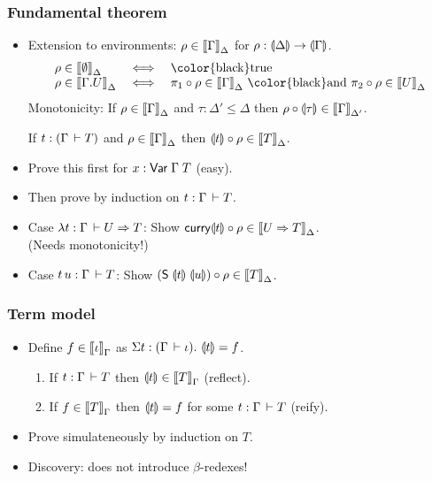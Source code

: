 \documentclass[t,fleqn,usenames,dvipsnames]{beamer}
\renewcommand{\Var}[2]{\tVar\;#1\;#2}
\newcommand{\mybox}[1]{\mbox{\color{black}#1}}
\renewcommand{\mand}{\ \mybox{and}\ }
\renewcommand{\mtrue}{\mybox{true}}
\begin{document}
\begin{frame}%
  \frametitle{Fundamental theorem}
  \vspace{-3ex}
  \begin{itemize}
  \item Extension to environments: $\rho \in \mathopen{{[\kern-0.14em[}} \Gamma \mathclose{{]\kern-0.14em]}}_{\Delta}$ for
    $\rho : \llparenthesis\Delta\rrparenthesis \to \llparenthesis\Gamma\rrparenthesis$.
\[
\begin{array}{lll}
  \rho \in \Den \cempty \Delta & \iff & \mtrue \\
  \rho \in \Den {\Gamma.U} \Delta & \iff &
    \pi_1 \comp \rho \in \Den \Gamma \Delta \mand
    \pi_2 \comp \rho \in \Den U \Delta
\end{array}
\]
  Monotonicity: If $\rho \in \mathopen{{[\kern-0.14em[}} \Gamma \mathclose{{]\kern-0.14em]}}_{\Delta}$ and $\tau : \Delta'
  \leq \Delta$ then $\rho \circ \llparenthesis\tau\rrparenthesis \in \mathopen{{[\kern-0.14em[}} \Gamma \mathclose{{]\kern-0.14em]}}_{\Delta'}$.
\begin{theorem}
  If $t : (\Gamma \,\vdash T)$ and $\rho \in \mathopen{{[\kern-0.14em[}} \Gamma \mathclose{{]\kern-0.14em]}}_{\Delta}$ then
  $\llparenthesis t\rrparenthesis \circ \rho \in \mathopen{{[\kern-0.14em[}} T \mathclose{{]\kern-0.14em]}}_{\Delta}$.
\end{theorem}
  \item Prove this first for $x : \Var \Gamma T$ (easy).
  \item Then prove by induction on $t : \Gamma \,\vdash T$.
  \item Case $\lambda t : \Gamma \,\vdash U \Rightarrow T$:
    Show $\mathsf{curry} \llparenthesis t\rrparenthesis \circ \rho \in \mathopen{{[\kern-0.14em[}} U \Rightarrow T \mathclose{{]\kern-0.14em]}}_{\Delta}$. \\
    (Needs monotonicity!)
  \item Case $t\,u : \Gamma \,\vdash T$:
    Show $(\mathsf{S}\;\llparenthesis t\rrparenthesis \; \llparenthesis u\rrparenthesis) \circ \rho \in \mathopen{{[\kern-0.14em[}} T \mathclose{{]\kern-0.14em]}}_{\Delta}$.
  \end{itemize}
\end{frame}


\begin{frame}%
  \frametitle{Term model}
  \vspace{-3ex}
  \begin{itemize}
  \item Define $f \in \mathopen{{[\kern-0.14em[}} \iota \mathclose{{]\kern-0.14em]}}_{\Gamma}$ as $\Sigma t : (\Gamma \,\vdash
    \iota).\ \llparenthesis t\rrparenthesis = f$.
    \begin{theorem}
      \begin{enumerate}
      \item If $t : \Gamma \,\vdash T$ then $\llparenthesis t\rrparenthesis \in \mathopen{{[\kern-0.14em[}} T \mathclose{{]\kern-0.14em]}}_{\Gamma}$ (reflect).
      \item If $f \in \mathopen{{[\kern-0.14em[}} T \mathclose{{]\kern-0.14em]}}_{\Gamma}$ then $\llparenthesis t\rrparenthesis = f$ for some $t :
        \Gamma \,\vdash T$ (reify).
      \end{enumerate}
    \end{theorem}
  \item Prove simulateneously by induction on $T$.
  \item Discovery: does not introduce $\beta$-redexes!
  \end{itemize}
\end{frame}
\end{document}
